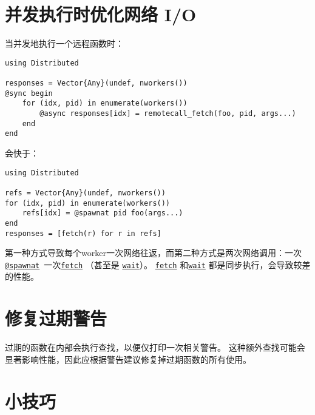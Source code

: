 \hypertarget{612858988935113727}{}


\section{并发执行时优化网络 I/O}



当并发地执行一个远程函数时：




\begin{verbatim}
using Distributed

responses = Vector{Any}(undef, nworkers())
@sync begin
    for (idx, pid) in enumerate(workers())
        @async responses[idx] = remotecall_fetch(foo, pid, args...)
    end
end
\end{verbatim}



会快于：




\begin{verbatim}
using Distributed

refs = Vector{Any}(undef, nworkers())
for (idx, pid) in enumerate(workers())
    refs[idx] = @spawnat pid foo(args...)
end
responses = [fetch(r) for r in refs]
\end{verbatim}



第一种方式导致每个worker一次网络往返，而第二种方式是两次网络调用：一次 \hyperlink{11231712027010946923}{\texttt{@spawnat}} 一次\hyperlink{11007884648860062495}{\texttt{fetch}} （甚至是 \hyperlink{13761789780433862250}{\texttt{wait}}）。 \hyperlink{11007884648860062495}{\texttt{fetch}} 和\hyperlink{13761789780433862250}{\texttt{wait}} 都是同步执行，会导致较差的性能。



\hypertarget{1574945516556538959}{}


\section{修复过期警告}



过期的函数在内部会执行查找，以便仅打印一次相关警告。 这种额外查找可能会显著影响性能，因此应根据警告建议修复掉过期函数的所有使用。



\hypertarget{3670078412083548982}{}


\section{小技巧}



